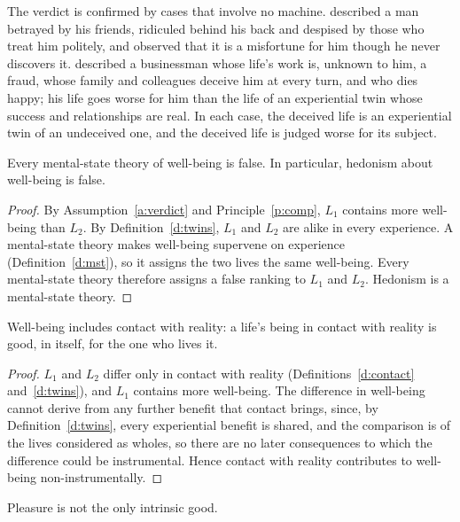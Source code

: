 \documentclass{situationist-preprint}
\begin{document}
The verdict is confirmed by cases that involve no machine. \citet{Nagel1970} described a man betrayed by his friends, ridiculed behind his back and despised by those who treat him politely, and observed that it is a misfortune for him though he never discovers it. \citet{Kagan1994} described a businessman whose life's work is, unknown to him, a fraud, whose family and colleagues deceive him at every turn, and who dies happy; his life goes worse for him than the life of an experiential twin whose success and relationships are real. In each case, the deceived life is an experiential twin of an undeceived one, and the deceived life is judged worse for its subject.

\begin{theorem}\label{t:mst}
Every mental-state theory of well-being is false. In particular, hedonism about well-being is false.
\end{theorem}

\begin{proof}
By Assumption~\ref{a:verdict} and Principle~\ref{p:comp}, $L_1$ contains more well-being than $L_2$. By Definition~\ref{d:twins}, $L_1$ and $L_2$ are alike in every experience. A mental-state theory makes well-being supervene on experience (Definition~\ref{d:mst}), so it assigns the two lives the same well-being. Every mental-state theory therefore assigns a false ranking to $L_1$ and $L_2$. Hedonism is a mental-state theory.
\end{proof}

\begin{corollary}\label{c:contact}
Well-being includes contact with reality: a life's being in contact with reality is good, in itself, for the one who lives it.
\end{corollary}

\begin{proof}
$L_1$ and $L_2$ differ only in contact with reality (Definitions~\ref{d:contact} and~\ref{d:twins}), and $L_1$ contains more well-being. The difference in well-being cannot derive from any further benefit that contact brings, since, by Definition~\ref{d:twins}, every experiential benefit is shared, and the comparison is of the lives considered as wholes, so there are no later consequences to which the difference could be instrumental. Hence contact with reality contributes to well-being non-instrumentally.
\end{proof}

\begin{corollary}\label{c:only}
Pleasure is not the only intrinsic good.
\end{corollary}
\end{document}
